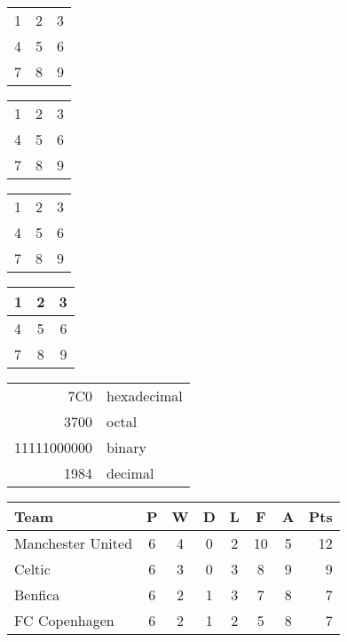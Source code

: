 \documentclass[12pt,a4paper,oneside,twocolumn]{article}
\begin{document}
	\begin{tabular}{ l c r }
		1 & 2 & 3 \\
		4 & 5 & 6 \\
		7 & 8 & 9 \\
	\end{tabular}

	\begin{tabular}{ l | c || r | }
		1 & 2 & 3 \\
		4 & 5 & 6 \\
		7 & 8 & 9 \\
	\end{tabular}

	\begin{tabular}{ l | c || r | }
		\hline			
		1 & 2 & 3 \\
		4 & 5 & 6 \\
		7 & 8 & 9 \\
		\hline  
	\end{tabular}

	\begin{center}
		\begin{tabular}{ l | c || r | }
			\hline
			1 & 2 & 3 \\ \hline
			4 & 5 & 6 \\ \hline
			7 & 8 & 9 \\
			\hline
		\end{tabular}
	\end{center}

	\begin{tabular}{|r|l|}
		\hline
		7C0 & hexadecimal \\
		3700 & octal \\ \cline{2-2}
		11111000000 & binary \\
		\hline \hline
		1984 & decimal \\
		\hline
	\end{tabular}

	\begin{tabular}{l*{6}{c}r}
		Team              & P & W & D & L & F  & A & Pts \\
		\hline
		Manchester United & 6 & 4 & 0 & 2 & 10 & 5 & 12  \\
		Celtic            & 6 & 3 & 0 & 3 & 8  & 9 & 9   \\
		Benfica           & 6 & 2 & 1 & 3 & 7  & 8 & 7   \\
		FC Copenhagen 	  & 6 & 2 & 1 & 2 & 5  & 8 & 7   \\
	\end{tabular}
\end{document}
